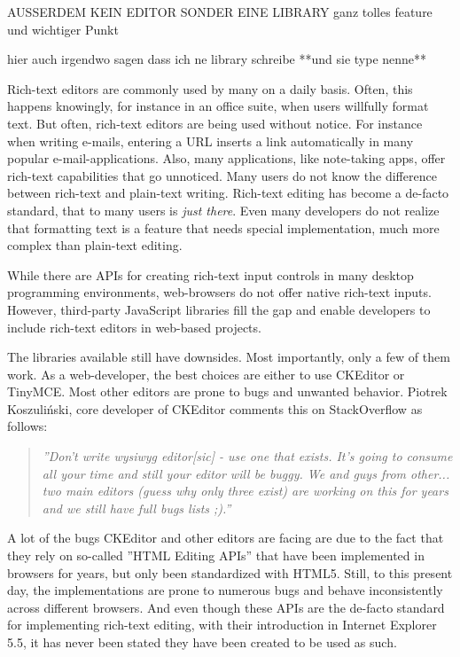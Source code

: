 AUSSERDEM KEIN EDITOR SONDER EINE LIBRARY ganz tolles feature und wichtiger Punkt

hier auch irgendwo sagen dass ich ne library schreibe **und sie type nenne**

Rich-text editors are commonly used by many on a daily basis. Often, this happens knowingly, for instance in an office suite, when users willfully format text. But often, rich-text editors are being used without notice. For instance when writing e-mails, entering a URL inserts a link automatically in many popular e-mail-applications. Also, many applications, like note-taking apps, offer rich-text capabilities that go unnoticed. Many users do not know the difference between rich-text and plain-text writing. Rich-text editing has become a de-facto standard, that to many users is \textit{just there}. Even many developers do not realize that formatting text is a feature that needs special implementation, much more complex than plain-text editing.

While there are APIs for creating rich-text input controls in many desktop programming environments, web-browsers do not offer native rich-text inputs. However, third-party JavaScript libraries fill the gap and enable developers to include rich-text editors in web-based projects.

The libraries available still have downsides. Most importantly, only a few of them work. As a web-developer, the best choices are either to use CKEditor or TinyMCE. Most other editors are prone to bugs and unwanted behavior. Piotrek Koszuli\'{n}ski, core developer of CKEditor comments this on StackOverflow as follows:

\begin{quotation}
\textit{''Don't write wysiwyg editor[sic] - use one that exists. It's going to consume all your time and still your editor will be buggy. We and guys from other... two main editors (guess why only three exist) are working on this for years and we still have full bugs lists ;).\cite{sopp}''}
\end{quotation} %

A lot of the bugs CKEditor and other editors are facing are due to the fact that they rely on so-called ''HTML Editing APIs'' that have been implemented in browsers for years, but only been standardized with HTML5. Still, to this present day, the implementations are prone to numerous bugs and behave inconsistently across different browsers. And even though these APIs are the de-facto standard for implementing rich-text editing, with their introduction in Internet Explorer 5.5, it has never been stated they have been created to be used as such.

